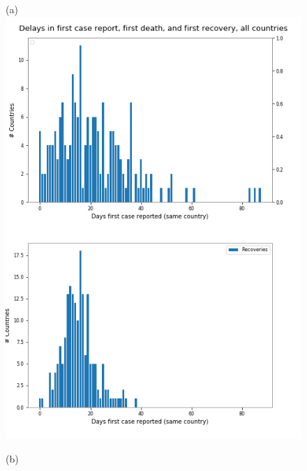 \documentclass[8pt]{article}
\begin{document}
\begin{figure}[h]
    \centering
    \begin{minipage}{0.5\textwidth}
    (a)\\
    \includegraphics[width=\textwidth]{figures/tsam_Covid19_JHU_delays_AllCountries}
    \end{minipage}%
    \begin{minipage}{0.5\textwidth}
    (b)\\

\end{minipage}
\end{figure}
\end{document}
